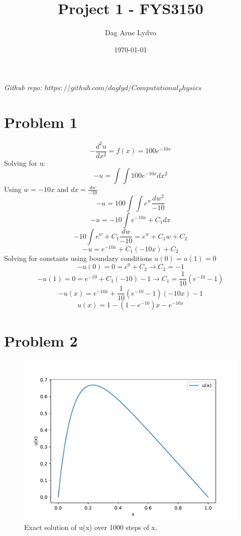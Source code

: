 \documentclass[english,notitlepage]{revtex4-1}  %
\begin{document}
\title{Project 1 - FYS3150}      %
\author{Dag Arne Lydvo}          %
\date{\today}                             %
\noaffiliation                            %


\maketitle 
    
\textit{Github repo: $https://github.com/daglyd/Computational_Physics$}
    
\section*{Problem 1}

\[-\frac{d^2u}{dx^2}=f(x)=100e^{-10x} \]
Solving for u:
\[-u = \int\int 100e^{-10x} dx^2\]
Using $w = -10x$ and $dx=\frac{dw}{-10}$
\[-u = 100\int\int e^{w}\frac{dw^2}{-10}\]
\[ -u = -10 \int e^{-10x}+C_1 dx\]
\[-10\int e^w +C_1 \frac{dw}{-10} = e^w + C_1w + C_2\]
\[-u = e^{-10x} +C_1(-10x)+C_2\]
Solving for constants using boundary conditions $u(0)=u(1)=0$
\[-u(0)=0=e^0 +C_2 \rightarrow C_2=-1\]
\[-u(1)=0=e^{-10}+C_1(-10)-1 \rightarrow C_1=\frac{1}{10}(e^{-10}-1)\]
\[-u(x) = e^{-10x}+\frac{1}{10}(e^{-10}-1)(-10x)-1\]
\[u(x)=1-(1-e^{-10})x - e^{-10x}\]


\section*{Problem 2}
\begin{figure}[H]
	\centering
	\includegraphics[scale=0.75]{../Figures/problem_2.pdf}
	\caption{Exact solution of u(x) over 1000 steps of x.}
\end{figure}
\end{document}
